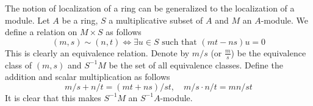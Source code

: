 \noindent
The notion of localization of a ring can be generalized to the
localization of a module. Let $A$ be a ring, $S$ a multiplicative
subset of $A$ and $M$ an $A$-module. We define a relation on
$M \times S$ as follows
$$
(m, s) \sim (n, t)
\Leftrightarrow
\exists u\in S \text{ such that } (mt-ns)u = 0
$$
This is clearly an equivalence relation. Denote by $m/s$ (or
$\frac{m}{s}$) be the equivalence class of $(m, s)$ and $S^{-1}M$ be
the set of all equivalence classes. Define the addition and scalar
multiplication as follows
$$
m/s + n/t = (mt + ns)/st,\quad
m/s\cdot n/t = mn/st
$$
It is clear that this makes $S^{-1}M$ an $S^{-1}A$-module.
